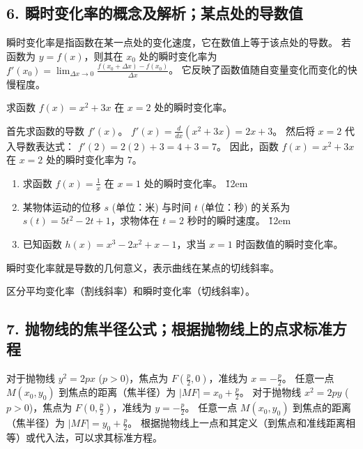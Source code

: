 \subsection*{6. 瞬时变化率的概念及解析；某点处的导数值}

\begin{theorem}
    瞬时变化率是指函数在某一点处的变化速度，它在数值上等于该点处的导数。
    若函数为 $y=f(x)$，则其在 $x_0$ 处的瞬时变化率为 $f'(x_0) = \lim_{\Delta x \to 0} \frac{f(x_0 + \Delta x) - f(x_0)}{\Delta x}$。
    它反映了函数值随自变量变化而变化的快慢程度。
\end{theorem}

\begin{example}
    求函数 $f(x) = x^2 + 3x$ 在 $x=2$ 处的瞬时变化率。
\end{example}
\begin{solution}
    首先求函数的导数 $f'(x)$。
    $f'(x) = \frac{d}{dx}(x^2 + 3x) = 2x + 3$。
    然后将 $x=2$ 代入导数表达式：
    $f'(2) = 2(2) + 3 = 4 + 3 = 7$。
    因此，函数 $f(x) = x^2 + 3x$ 在 $x=2$ 处的瞬时变化率为 $7$。
\end{solution}

\begin{problem}
\begin{enumerate}
    \item 求函数 $f(x) = \frac{1}{x}$ 在 $x=1$ 处的瞬时变化率。
          \v{12em}
    \item 某物体运动的位移 $s$ (单位：米) 与时间 $t$ (单位：秒) 的关系为 $s(t) = 5t^2 - 2t + 1$，求物体在 $t=2$ 秒时的瞬时速度。
          \v{12em}
    \item 已知函数 $h(x) = x^3 - 2x^2 + x - 1$，求当 $x=1$ 时函数值的瞬时变化率。
\end{enumerate}
\end{problem}
\begin{tips}
    瞬时变化率就是导数的几何意义，表示曲线在某点的切线斜率。
\end{tips}
\begin{warning}
    区分平均变化率（割线斜率）和瞬时变化率（切线斜率）。
\end{warning}

\subsection*{7. 抛物线的焦半径公式；根据抛物线上的点求标准方程}
\begin{theorem}
    对于抛物线 $y^2 = 2px$ ($p>0$)，焦点为 $F(\frac{p}{2}, 0)$，准线为 $x = -\frac{p}{2}$。
    任意一点 $M(x_0, y_0)$ 到焦点的距离（焦半径）为 $|MF| = x_0 + \frac{p}{2}$。
    对于抛物线 $x^2 = 2py$ ($p>0$)，焦点为 $F(0, \frac{p}{2})$，准线为 $y = -\frac{p}{2}$。
    任意一点 $M(x_0, y_0)$ 到焦点的距离（焦半径）为 $|MF| = y_0 + \frac{p}{2}$。
    根据抛物线上一点和其定义（到焦点和准线距离相等）或代入法，可以求其标准方程。
\end{theorem}

